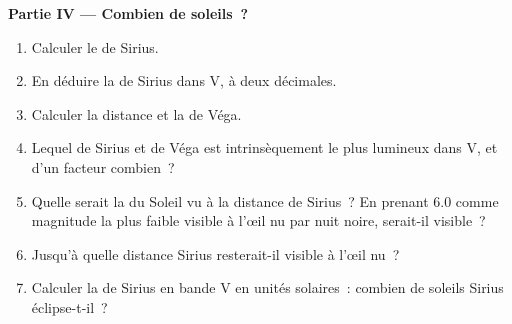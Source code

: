 \begin{problem}
\medskip
\noindent\textbf{Partie IV --- Combien de soleils~?}
\begin{enumerate}[resume]
  \item Calculer le  de Sirius.
  \item En déduire la  de Sirius dans V, à deux décimales.
  \item Calculer la distance et la  de Véga.
  \item Lequel de Sirius et de Véga est intrinsèquement le plus lumineux dans V,
        et d'un facteur combien~?
  \item Quelle serait la  du Soleil vu à la distance de
        Sirius~? En prenant 6.0 comme magnitude la plus faible visible à l'œil
        nu par nuit noire, serait-il visible~?
  \item Jusqu'à quelle distance Sirius resterait-il visible à l'œil nu~?
  \item Calculer la  de Sirius en bande V en unités solaires~:
        combien de soleils Sirius éclipse-t-il~?
\end{enumerate}
\end{problem}
